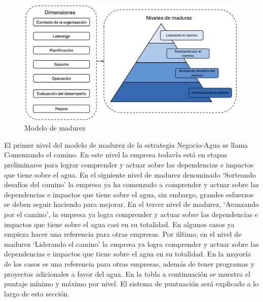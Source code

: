 \begin{figure}[H]
    \centering
    \includegraphics[scale=0.4]{images/5-implementacion/modelo-madurez.png}
    \caption{Modelo de madurez}
    \label{fig:modelo-madurez}
\end{figure}

El primer nivel del modelo de madurez de la estrategia Negocio-Agua se llama Comenzando el camino. En este nivel la empresa todavía está en etapas preliminares para lograr comprender y actuar sobre las dependencias e impactos que tiene sobre el agua. En el siguiente nivel de madurez denominado ‘Sorteando desafíos del camino’ la empresa ya ha comenzado a comprender y actuar sobre las dependencias e impactos que tiene sobre el agua, sin embargo, grandes esfuerzos se deben seguir haciendo para mejorar. En el tercer nivel de madurez, ‘Avanzando por el camino’, la empresa ya logra comprender y actuar sobre las dependencias e impactos que tiene sobre el agua casi en su totalidad. En algunos casos ya empieza hacer una referencia para otras empresas. Por último, en el nivel de madurez ‘Liderando el camino’ la empresa ya logra comprender y actuar sobre las dependencias e impactos que tiene sobre el agua en su totalidad. En la mayoría de los casos es una referencia para otras empresas, además de tener programas y proyectos adicionales a favor del agua. En la tabla a continuación se muestra el puntaje mínimo y máximo por nivel. El sistema de puntuación será explicado a lo largo de esta sección.



